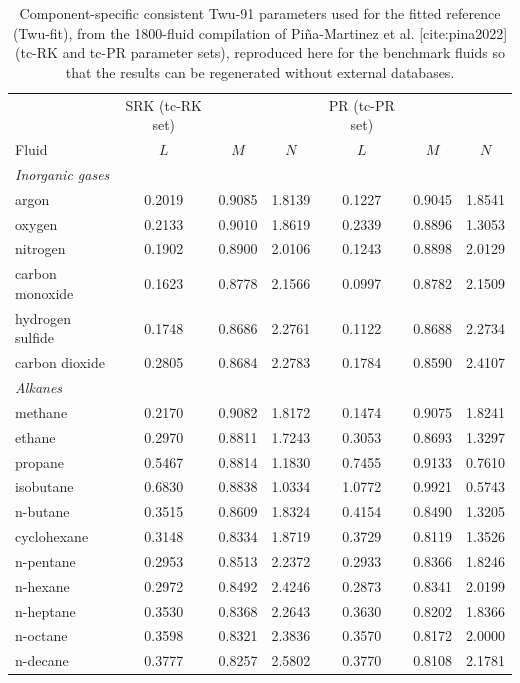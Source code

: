 \begin{table}[H]
\centering
\caption{Component-specific consistent Twu-91 parameters used for the fitted reference (Twu-fit), from the 1800-fluid compilation of Pi\~na-Martinez et al. [cite:pina2022] (tc-RK and tc-PR parameter sets), reproduced here for the benchmark fluids so that the results can be regenerated without external databases.}
\label{tab:tabS_twufit}
\small
\begin{tabular}{lcccccc}
\toprule
 & SRK (tc-RK set) &  &  & PR (tc-PR set) &  &  \\
Fluid & $L$ & $M$ & $N$ & $L$ & $M$ & $N$ \\
\midrule
\multicolumn{7}{l}{\emph{Inorganic gases}} \\
argon & 0.2019 & 0.9085 & 1.8139 & 0.1227 & 0.9045 & 1.8541 \\
oxygen & 0.2133 & 0.9010 & 1.8619 & 0.2339 & 0.8896 & 1.3053 \\
nitrogen & 0.1902 & 0.8900 & 2.0106 & 0.1243 & 0.8898 & 2.0129 \\
carbon monoxide & 0.1623 & 0.8778 & 2.1566 & 0.0997 & 0.8782 & 2.1509 \\
hydrogen sulfide & 0.1748 & 0.8686 & 2.2761 & 0.1122 & 0.8688 & 2.2734 \\
carbon dioxide & 0.2805 & 0.8684 & 2.2783 & 0.1784 & 0.8590 & 2.4107 \\
\multicolumn{7}{l}{\emph{Alkanes}} \\
methane & 0.2170 & 0.9082 & 1.8172 & 0.1474 & 0.9075 & 1.8241 \\
ethane & 0.2970 & 0.8811 & 1.7243 & 0.3053 & 0.8693 & 1.3297 \\
propane & 0.5467 & 0.8814 & 1.1830 & 0.7455 & 0.9133 & 0.7610 \\
isobutane & 0.6830 & 0.8838 & 1.0334 & 1.0772 & 0.9921 & 0.5743 \\
n-butane & 0.3515 & 0.8609 & 1.8324 & 0.4154 & 0.8490 & 1.3205 \\
cyclohexane & 0.3148 & 0.8334 & 1.8719 & 0.3729 & 0.8119 & 1.3526 \\
n-pentane & 0.2953 & 0.8513 & 2.2372 & 0.2933 & 0.8366 & 1.8246 \\
n-hexane & 0.2972 & 0.8492 & 2.4246 & 0.2873 & 0.8341 & 2.0199 \\
n-heptane & 0.3530 & 0.8368 & 2.2643 & 0.3630 & 0.8202 & 1.8366 \\
n-octane & 0.3598 & 0.8321 & 2.3836 & 0.3570 & 0.8172 & 2.0000 \\
n-decane & 0.3777 & 0.8257 & 2.5802 & 0.3770 & 0.8108 & 2.1781 \\

\end{tabular}
\end{table}
